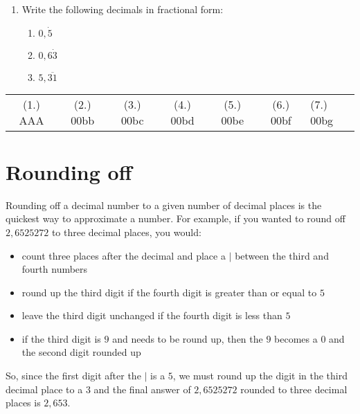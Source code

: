 \begin{exercises}{}
{\begin{enumerate}[itemsep=5pt, label=\textbf{\arabic*}. ]
\begin{enumerate}[itemsep=5pt, label=\textbf{(\alph*)} ]
    \item $4\dfrac{5}{6}$
    \item $2\dfrac{1}{9}$
    \end{enumerate}
\item Write the following decimals in fractional form:
    \begin{enumerate}[itemsep=3pt, label=\textbf{(\alph*)} ] 
    \item $0,\dot{5}$
    \item $0,6\dot{3}$
    \item $5,\overline{31}$
    \end{enumerate}
\end{enumerate}
\practiceinfo 
\par 
 \par \begin{tabular}[h]{cccccc}
 (1.) AAA& (2.) 00bb&  (3.) 00bc&  (4.) 00bd& (5.) 00be& (6.) 00bf& (7.) 00bg\end{tabular}
}
\end{exercises}

\section{Rounding off}
\nopagebreak
Rounding off a decimal number to a given number of decimal places is
the quickest way to approximate a number. For example, if you wanted
to round off $2,6525272$ to three decimal places, you would:
\begin{itemize}
\item count three places after the decimal and place a $|$ between the third and fourth numbers
\item round up the third digit if the fourth digit is greater than or equal to $5$
\item leave the third digit unchanged if the fourth digit is less than $5$
\item if the third digit is $9$ and needs to be round up, then the $9$ becomes a $0$ and the second digit rounded up
\end{itemize}
\par 
So, since the first digit after the $|$ is a $5$, we must round up the digit in the third decimal place to a $3$ and the final answer of $2,6525272$ rounded to three decimal places is $2,653$.
\par



